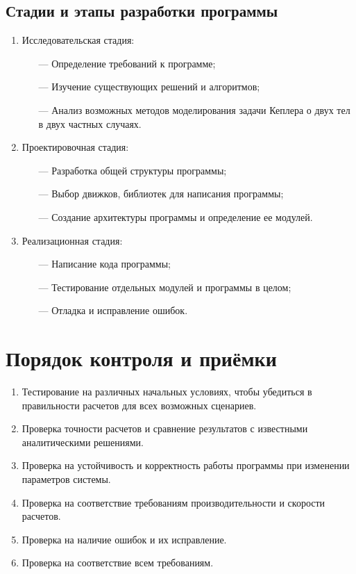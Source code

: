  \subsection{Стадии и этапы разработки программы}
 \begin{enumerate}
  \item Исследовательская стадия:
   \begin{itemize}
    \item[—] Определение требований к программе;
    \item[—] Изучение существующих решений и алгоритмов;
    \item[—] Анализ возможных методов моделирования задачи Кеплера о двух тел в двух частных случаях.
   \end{itemize}
     \item Проектировочная стадия:
   \begin{itemize}
    \item[—] Разработка общей структуры программы;
    \item[—] Выбор движков, библиотек для написания программы;
    \item[—] Создание архитектуры программы и определение ее модулей.
   \end{itemize}
     \item Реализационная стадия:
   \begin{itemize}
    \item[—] Написание кода программы;
    \item[—] Тестирование отдельных модулей и программы в целом;
    \item[—] Отладка и исправление ошибок.
   \end{itemize}
 \end{enumerate}



 \section{Порядок контроля и приёмки}
 \begin{enumerate}
  \item Тестирование на различных начальных условиях, чтобы убедиться в правильности расчетов для всех возможных сценариев.
  \item Проверка точности расчетов и сравнение результатов с известными аналитическими решениями.
  \item Проверка на устойчивость и корректность работы программы при изменении параметров системы.
  \item Проверка на соответствие требованиям производительности и скорости расчетов.
  \item Проверка на наличие ошибок и их исправление.
  \item Проверка на соответствие всем требованиям.
 \end{enumerate}

